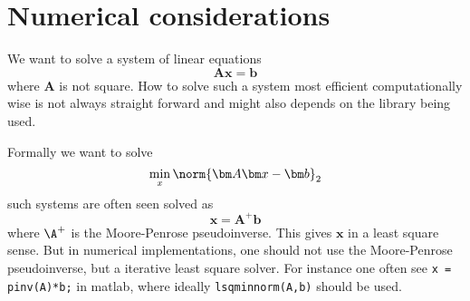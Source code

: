 
\chapter{Numerical considerations}
\label{chap:numerical_appendix}

We want to solve a system of linear equations
\begin{equation}
  \bm A \bm x = \bm b
\end{equation}
where $\bm A$ is not square. How to solve such a system most efficient
computationally wise is not always straight forward and might also depends on
the library being used.


Formally we want to solve
\begin{equation}
  \min_x \norm{\bm A \bm x - \bm b}_2
\end{equation}
such systems are often seen solved as
\begin{equation}
  \bm x = \bm A^+\bm b
\end{equation}
where $\A^+$ is the Moore-Penrose pseudoinverse. This gives $\bm x$ in a least
square sense. But in numerical implementations, one should not use the
Moore-Penrose pseudoinverse, but a iterative least square solver. For instance
one often see \texttt{x = pinv(A)*b;} in matlab, where ideally
\texttt{lsqminnorm(A,b)} should be used.

